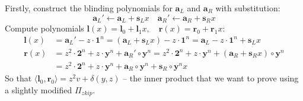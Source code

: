 \documentclass[../../book.tex]{subfiles}
\begin{document}
Firstly, construct the blinding polynomials for $\mathbf{a}_L$ and $\mathbf{a}_R$ with substitution:
$$\mathbf{a}_L' \gets \mathbf{a}_L + \mathbf{s}_L x \quad \mathbf{a}_R' \gets \mathbf{a}_R + \mathbf{s}_R x$$
Compute polynomials $\mathbf{l}(x) = \mathbf{l}_0 + \mathbf{l}_1 x, \quad \mathbf{r}(x) = \mathbf{r}_0 + \mathbf{r}_1 x$:
\begin{align*}
    \mathbf{l}(x) &= \mathbf{a}_L' - z \cdot \mathbf{1}^n = (\mathbf{a}_L + \mathbf{s}_L x) - z \cdot \mathbf{1}^n = \mathbf{a}_L - z \cdot \mathbf{1}^n + \mathbf{s}_L x\\
    \mathbf{r}(x) &= z^2 \cdot \mathbf{2}^n + z \cdot \mathbf{y}^n + \mathbf{a}_R' \circ \mathbf{y}^n = z^2 \cdot \mathbf{2}^n + z \cdot \mathbf{y}^n + (\mathbf{a}_R + \mathbf{s}_R x) \circ \mathbf{y}^n \\
    & = z^2 \cdot \mathbf{2}^n + z \cdot \mathbf{y}^n + \mathbf{a}_R \circ \mathbf{y}^n + \mathbf{s}_R \circ \mathbf{y}^n x
\end{align*}
So that $\langle \mathbf{l}_0, \mathbf{r}_0 \rangle = z^2v + \delta(y,z)$ -- the inner product that we want to prove using a slightly modified $\Pi_{zkip}$.
\end{document}

